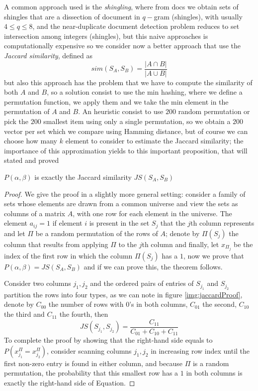     A common approach used is the \emph{shingling}, where from docs we obtain sets of shingles that are a dissection of document in $q-$gram (shingles), with usually $4 \leq q \leq 8$,
    and the near-duplicate document detection problem reduces to set intersection among integers (shingles), but this naive approaches is computationally expensive so we consider now
    a better approach that use the \emph{Jaccard similarity}, defined as 
    \[ sim(S_A, S_B) = \frac{| A \cap B|}{|A \cup B|} \]
    but also this approach has the problem that we have to compute the similarity of both $A$ and $B$, so a solution consist to use the min hashing, where we define a permutation function,
    we apply them and we take the min element in the permutation of $A$ and $B$.\newline
    An heuristic consist to use $200$ random permutation or pick the $200$ smallest item using only a single permutation, so we obtain a $200$ vector per set which we compare using Hamming distance,
    but of course we can choose how many $k$ element to consider to estimate the Jaccard similarity; the importance of this approximation yields to this important proposition, that will stated and proved
    \begin{prop}
	    $P(\alpha, \beta)$ is exactly the Jaccard similarity $JS(S_A, S_B)$
    \end{prop}
    \begin{proof}
	We give the proof in a slightly more general setting: consider a family of sets whose elements are drawn from a common universe and 
	view the sets as columns of a matrix $A$, with one row for each element in the universe.\newline
	The element $a_{ij} = 1$ if element $i$ is present in the set $S_j$ that the $j$th column represents and let $\Pi$ be a random permutation of  the  rows of $A$;
	denote  by $\Pi(S_j)$ the column that results from applying $\Pi$ to the $j$th column and finally, let $x_{\Pi_j}$ be the index of the first row in which the column
	$\Pi(S_j)$ has a $1$, now we prove that $P(\alpha, \beta) = JS(S_A, S_B)$ and if we can prove this, the theorem follows.

	Consider two columns $j_1, j_2$ and the ordered pairs of entries of $S_{j_1}$ and $S_{j_2}$ partition the rows into four types, as we can note in figure \ref{img:jaccardProof},
	denote by $C_{00}$ the number of rows with $0$’s in both columns, $C_{01}$ the second, $C_{10}$ the third and $C_{11}$ the fourth, then 
	\[ JS(S_{j_1}, S_{j_2}) = \frac{C_{11}}{C_{01} + C_{10} + C_{11}} \]
	To complete the proof by showing that the right-hand side equals to $P(x_{j_1}^{\Pi} = x_{j_2}^{\Pi})$, consider scanning columns $j_1,j_2$ in increasing row
	index until the first non-zero entry is found in either column, and because $\Pi$ is a random permutation, the probability that this smallest row
	has a $1$ in both columns is exactly the right-hand side of Equation.
    \end{proof}
